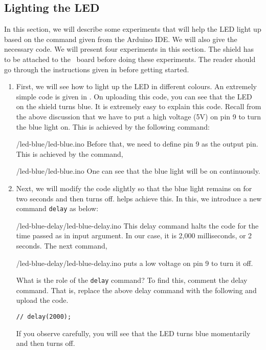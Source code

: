 \subsection{Lighting the LED}
\label{sec:light-ard}
In this section, we will describe some experiments that will help the
LED light up based on the command given from the Arduino IDE.  We will
also give the necessary code.  We will present four experiments in
this section.  The shield has to be attached to the \arduino\ board
before doing these experiments.  The reader should go through the
instructions given in  before getting started.
\begin{enumerate}
  \item First, we will see how to light up the LED in different
        colours.  An extremely simple code is given in .
        On uploading this code, you can see that the LED on the shield turns
        blue.  It is extremely easy to explain this code.  Recall from the
        above discussion that we have to put a high voltage (5V) on pin 9 to
        turn the blue light on.  This is achieved by the following command:
        
        {\LocLEDardcode/led-blue/led-blue.ino}
        Before that, we need to define pin 9 as the
        output pin.  This is achieved by the command,
        
        {\LocLEDardcode/led-blue/led-blue.ino}
        One can see that the blue light will be on continuously.  
        
  \item Next, we will modify the code slightly so that the blue light
        remains on for two seconds and then turns off.
         helps achieve this.  In this, we
        introduce a new command {\tt delay} as below:
        
        {\LocLEDardcode/led-blue-delay/led-blue-delay.ino} This delay
        command halts the code for the time passed as in input argument. In
        our case, it is 2,000 milliseconds, or 2 seconds.  The next command,
        
        {\LocLEDardcode/led-blue-delay/led-blue-delay.ino} puts a low
        voltage on pin 9 to turn it off.
        
        What is the role of the {\tt delay} command?  To find this,
        comment the delay command.  That is, replace the above delay command
        with the following and upload the code.
        \begin{lstlisting}[style=nonumbers]
    // delay(2000);
  \end{lstlisting}
        If you observe carefully, you will see that the LED turns blue
        momentarily and then turns off.
        

\end{enumerate}
